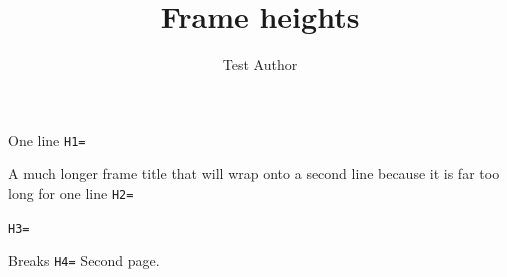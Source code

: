 \documentclass[aspectratio=169,9pt]{beamer}
\title{Frame heights}
\author{Test Author}
\begin{document}
\begin{frame}{One line}
	\texttt{H1=\the\dimexpr\jobyframeheight\relax}
\end{frame}
\begin{frame}{A much longer frame title that will wrap onto a second line because it is far too long for one line}
	\texttt{H2=\the\dimexpr\jobyframeheight\relax}
\end{frame}
\begin{frame}[plain]
	\texttt{H3=\the\dimexpr\jobyframeheight\relax}
\end{frame}
\begin{frame}[allowframebreaks]{Breaks}
	\texttt{H4=\the\dimexpr\jobyframeheight\relax}
	\framebreak
	Second page.
\end{frame}
\end{document}
